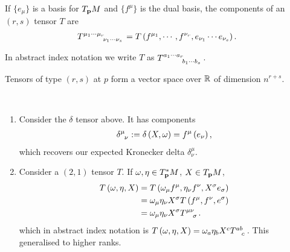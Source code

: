 \begin{definition}
    If $\{e_{\mu}\}$ is a basis for $T_{\vb{p}} M$ and $\{f^{\mu}\}$ is the dual basis, the components of an $\left( r,s \right) $ tensor $T$ are
    \begin{align}
        \tensor{T}{^{\mu_1 \cdots \mu_r}_{\nu_1 \cdots \nu_s}} = T \left( f^{\mu_1}, \cdots, f^{\nu_r} , e_{\nu_1} \cdots e_{\nu_s}\right) 
    .\end{align}
\end{definition}

In abstract index notation we write $T$ as $\tensor{T}{^{a_1 \cdots a_r} _{b_1 \cdots b_s}}$.

\begin{note}
    Tensors of type $\left( r,s \right) $ at $p$ form a vector space over $\mathbb{R}$ of dimension $n^{r+s}$.
\end{note}

\begin{examples}~
    \begin{enumerate}[label=\arabic*)]
        \item Consider the $\delta$ tensor above. It has components
            \begin{align}
                \tensor{\delta}{^{\mu}_\nu} := \delta \left( X, \omega \right) = f^{\mu} \left( e_\nu \right) 
            ,\end{align}
            which recovers our expected Kronecker delta $\delta^{\mu}_\nu$.
        \item Consider a $\left( 2, 1 \right) $ tensor $T$. If $\omega, \eta \in T_{\vb{p}}^{*} M$, $X \in T_{\vb{p}} M$,
            \begin{align}
                T \left( \omega, \eta, X \right) &= T \left( \omega_\mu f^{\mu}, \eta_\nu f^{\nu}, X^{\sigma} e_\sigma \right) \\
                &= \omega_\mu \eta_\nu X^{\sigma} T \left( f^{\mu}, f^{\nu}, e^{\sigma} \right)  \\
                &= \omega_\mu \eta_\nu X^{\sigma} \tensor{T}{^{\mu \nu}_\sigma} 
            .\end{align}
            which in abstract index notation is $T \left( \omega, \eta, X \right) = \omega_a \eta_b X^{c} \tensor{T}{^{ab}_c}$. This generalised to higher ranks.
    \end{enumerate}
\end{examples}
